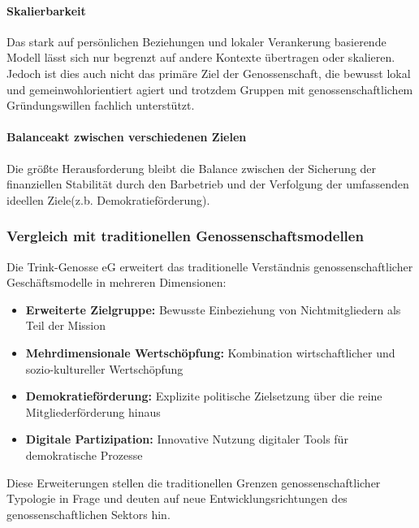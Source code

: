 \paragraph{Skalierbarkeit}
Das stark auf persönlichen Beziehungen und lokaler Verankerung basierende Modell lässt sich nur begrenzt auf andere Kontexte übertragen oder skalieren. Jedoch ist dies auch nicht das primäre Ziel der Genossenschaft, die bewusst lokal und gemeinwohlorientiert agiert und trotzdem Gruppen mit genossenschaftlichem Gründungswillen fachlich unterstützt.

\paragraph{Balanceakt zwischen verschiedenen Zielen}
Die größte Herausforderung bleibt die Balance zwischen der Sicherung der finanziellen Stabilität durch den Barbetrieb und der Verfolgung der umfassenden ideellen Ziele(z.b. Demokratieförderung).

\subsubsection{Vergleich mit traditionellen Genossenschaftsmodellen}

Die Trink-Genosse eG erweitert das traditionelle Verständnis genossenschaftlicher Geschäftsmodelle in mehreren Dimensionen:

\begin{itemize}
\item \textbf{Erweiterte Zielgruppe:} Bewusste Einbeziehung von Nichtmitgliedern als Teil der Mission
\item \textbf{Mehrdimensionale Wertschöpfung:} Kombination wirtschaftlicher und sozio-kultureller Wertschöpfung
\item \textbf{Demokratieförderung:} Explizite politische Zielsetzung über die reine Mitgliederförderung hinaus
\item \textbf{Digitale Partizipation:} Innovative Nutzung digitaler Tools für demokratische Prozesse
\end{itemize}

Diese Erweiterungen stellen die traditionellen Grenzen genossenschaftlicher Typologie in Frage und deuten auf neue Entwicklungsrichtungen des genossenschaftlichen Sektors hin.
